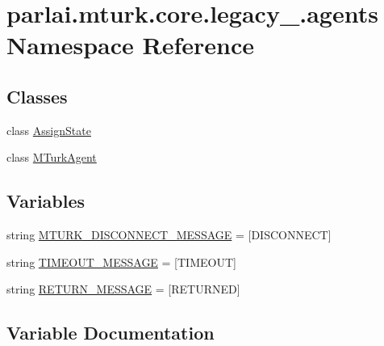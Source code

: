 \hypertarget{namespaceparlai_1_1mturk_1_1core_1_1legacy__2018_1_1agents}{}\section{parlai.\+mturk.\+core.\+legacy\+\_.\+agents Namespace Reference}
\label{namespaceparlai_1_1mturk_1_1core_1_1legacy__2018_1_1agents}
\subsection*{Classes}
\begin{DoxyCompactItemize}
\item 
class \hyperlink{classparlai_1_1mturk_1_1core_1_1legacy__2018_1_1agents_1_1AssignState}{Assign\+State}
\item 
class \hyperlink{classparlai_1_1mturk_1_1core_1_1legacy__2018_1_1agents_1_1MTurkAgent}{M\+Turk\+Agent}
\end{DoxyCompactItemize}
\subsection*{Variables}
\begin{DoxyCompactItemize}
\item 
string \hyperlink{namespaceparlai_1_1mturk_1_1core_1_1legacy__2018_1_1agents_a187279658e5cf634e01e71c915483582}{M\+T\+U\+R\+K\+\_\+\+D\+I\+S\+C\+O\+N\+N\+E\+C\+T\+\_\+\+M\+E\+S\+S\+A\+GE} = \textquotesingle{}\mbox{[}D\+I\+S\+C\+O\+N\+N\+E\+CT\mbox{]}\textquotesingle{}
\item 
string \hyperlink{namespaceparlai_1_1mturk_1_1core_1_1legacy__2018_1_1agents_a7a548a76a2648d3c1062d3af875ec373}{T\+I\+M\+E\+O\+U\+T\+\_\+\+M\+E\+S\+S\+A\+GE} = \textquotesingle{}\mbox{[}T\+I\+M\+E\+O\+UT\mbox{]}\textquotesingle{}
\item 
string \hyperlink{namespaceparlai_1_1mturk_1_1core_1_1legacy__2018_1_1agents_aa2b7730da7744af6051d6dc06a3ea858}{R\+E\+T\+U\+R\+N\+\_\+\+M\+E\+S\+S\+A\+GE} = \textquotesingle{}\mbox{[}R\+E\+T\+U\+R\+N\+ED\mbox{]}\textquotesingle{}
\end{DoxyCompactItemize}


\subsection{Variable Documentation}
\mbox{\label{namespaceparlai_1_1mturk_1_1core_1_1legacy__2018_1_1agents_a187279658e5cf634e01e71c915483582}} 
